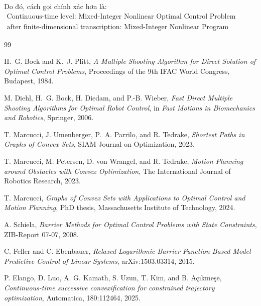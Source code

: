 \documentclass[12pt]{article}
\begin{document}
Do đó, cách gọi chính xác hơn là:
\begin{equation*}
\boxed{
\begin{array}{c}
\text{Continuous-time level: Mixed-Integer Nonlinear Optimal Control Problem (MIOCP),}\\
\text{after finite-dimensional transcription: Mixed-Integer Nonlinear Program (MINLP).}
\end{array}}
\end{equation*}

\begin{thebibliography}{99}

H.~G. Bock and K.~J. Plitt,
\newblock \emph{A Multiple Shooting Algorithm for Direct Solution of Optimal Control Problems},
\newblock Proceedings of the 9th IFAC World Congress, Budapest, 1984.

M. Diehl, H.~G. Bock, H. Diedam, and P.-B. Wieber,
\newblock \emph{Fast Direct Multiple Shooting Algorithms for Optimal Robot Control},
\newblock in \emph{Fast Motions in Biomechanics and Robotics}, Springer, 2006.

T. Marcucci, J. Umenberger, P.~A. Parrilo, and R. Tedrake,
\newblock \emph{Shortest Paths in Graphs of Convex Sets},
\newblock SIAM Journal on Optimization, 2023.

T. Marcucci, M. Petersen, D. von Wrangel, and R. Tedrake,
\newblock \emph{Motion Planning around Obstacles with Convex Optimization},
\newblock The International Journal of Robotics Research, 2023.

T. Marcucci,
\newblock \emph{Graphs of Convex Sets with Applications to Optimal Control and Motion Planning},
\newblock PhD thesis, Massachusetts Institute of Technology, 2024.


A. Schiela,
\newblock \emph{Barrier Methods for Optimal Control Problems with State Constraints},
\newblock ZIB-Report 07-07, 2008.

C. Feller and C. Ebenbauer,
\newblock \emph{Relaxed Logarithmic Barrier Function Based Model Predictive Control of Linear Systems},
\newblock arXiv:1503.03314, 2015.

P. Elango, D. Luo, A. G. Kamath, S. Uzun, T. Kim, and B. Açıkmeşe,
\newblock \emph{Continuous-time successive convexification for constrained trajectory optimization},
\newblock Automatica, 180:112464, 2025.

\end{thebibliography}
\end{document}
